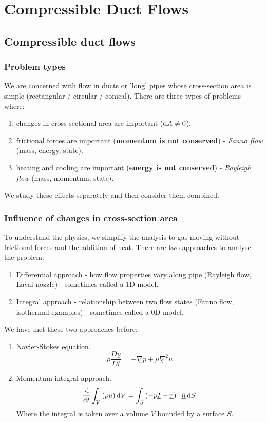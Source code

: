 \chapter{Compressible Duct Flows}
\section{Compressible duct flows}
\subsection{Problem types}
We are concerned with flow in ducts or 'long' pipes whose cross-section area is simple (rectangular / circular / conical). There are three types of problems where:
\begin{enumerate}[noitemsep]
    \item changes in cross-sectional area are important ($\dif A \neq 0$).
    \item frictional forces are important (\textbf{momentum is not conserved}) - \textit{Fanno flow} (mass, energy, state).
    \item heating and cooling are important (\textbf{energy is not conserved}) - \textit{Rayleigh flow} (mass, momentum, state).
\end{enumerate}
We study these effects separately and then consider them combined.
\subsection{Influence of changes in cross-section area}
To understand the physics, we simplify the analysis to gas moving without frictional forces and the addition of heat. There are two approaches to analyse the problem:
\begin{enumerate}[noitemsep]
    \item Differential approach - how flow properties vary along pipe (Rayleigh flow, Laval nozzle) - sometimes called a 1D model.
    \item Integral approach - relationship between two flow states (Fanno flow, isothermal examples) - sometimes called a 0D model.
\end{enumerate}
We have met these two approaches before:
\begin{enumerate}
    \item Navier-Stokes equation. $$\rho \dfrac{D\underline{u}}{Dt} = - \underline{\nabla} p + \mu \underline{\nabla}^2 \underline{u}$$
    \item Momentum-integral approach. $$\dfrac{\dif}{\dif t} \int_V \left(\rho u\right)\dif V = \int_S \left(-p\underline{I} + \underline{\tau}\right)\cdot \underline{\hat{n}}\dif S$$ Where the integral is taken over a volume $V$ bounded by a surface $S$.
\end{enumerate}
